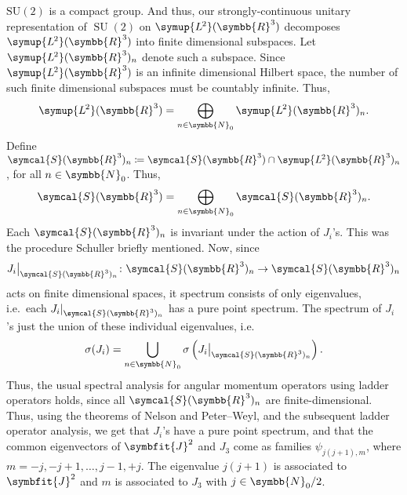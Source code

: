 \documentclass[12pt, a4 paper]{article}
\theoremstyle{definition}
\newcommand{\ltwo}{\symup{L\kern-0.5pt^2}}
\newcommand{\ltworthree}{\ltwo(\rr^3)}
\newcommand{\rr}{\symbb{R}}
\newcommand{\nn}{\symbb{N}_0}
\newcommand{\schwartz}{\symcal{S}}
\newcommand{\schwartzrthree}{\schwartz(\rr^3)}
\newcommand{\spec}{\sigma}
\newcommand{\SUtwo}{\operatorname{SU}(2)}
\newcommand\restr[2]{{%
        \left.\kern-\nulldelimiterspace %
        #1 %
        \littletaller %
        \right|_{#2} %
    }}
\newcommand{\littletaller}{\mathchoice{\vphantom{\big|}}{}{}{}}
\begin{document}
    \(\operatorname{SU(2)}\) is a compact group. And thus, our strongly-continuous unitary representation of \(\SUtwo\) on \(\ltworthree\) decomposes \(\ltworthree\) into finite dimensional subspaces. Let \(\ltworthree_n\) denote such a subspace. Since \(\ltworthree\) is an infinite dimensional Hilbert space, the number of such finite dimensional subspaces must be countably infinite. Thus,
    \[
        \ltworthree = \bigoplus_{n \in \nn} \ltworthree_n.
    \]
    Define \(\schwartzrthree_n \coloneq \schwartzrthree \cap \ltworthree_n\), for all \(n \in \nn\). Thus,
    \[
    \schwartzrthree = \bigoplus_{n \in \nn} \schwartzrthree_n.
    \]
    Each \(\schwartzrthree_n\) is invariant under the action of \(J_i\)'s. This was the procedure Schuller briefly mentioned. Now, since \[\restr{J_i}{\schwartzrthree_n} \colon \schwartzrthree_n \rightarrow \schwartzrthree_n\] acts on finite dimensional spaces, it spectrum consists of only eigenvalues, i.e.\ each \(\restr{J_i}{\schwartzrthree_n}\) has a pure point spectrum. The spectrum of \(J_i\)'s just the union of these individual eigenvalues, i.e.\
    \[
        \spec(J_i) = \bigcup_{n \in \nn} \spec\left(\restr{J_i}{\schwartzrthree_n}\right).
    \]
    Thus, the usual spectral analysis for angular momentum operators using ladder operators holds, since all \(\schwartzrthree_n\) are finite-dimensional. Thus, using the theorems of Nelson and Peter--Weyl, and the subsequent ladder operator analysis, we get that $J_i$'s have a pure point spectrum, and that the common eigenvectors of $\symbfit{J}^2$ and $J_3$ come as families $\psi_{j(j+1), m}$, where $m = -j, -j+1, \ldots, j-1, +j$. The eigenvalue $j(j+1)$ is associated to $\symbfit{J}^2$ and $m$ is associated to $J_3$ with $j \in \symbb{N}_0/2$.
\end{document}
